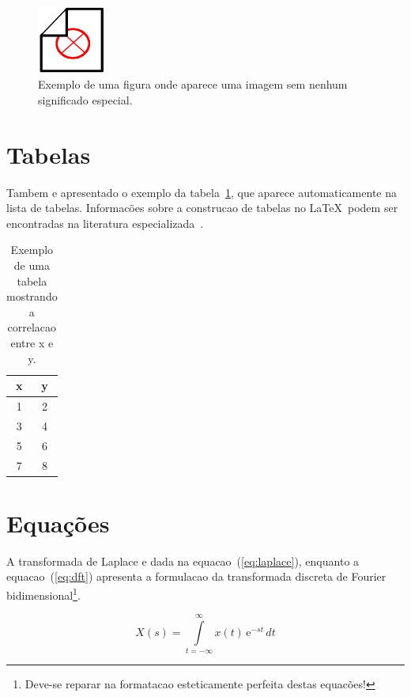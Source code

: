 \documentclass[openright]{normas-utf-tex} %
\begin{document}
\begin{figure}[!htb]
	\centering
	\includegraphics[width=0.2\textwidth]{./dummy.png} %
	\caption[Exemplo de uma figura]{Exemplo de uma figura onde aparece uma imagem sem nenhum significado especial.}
	\label{fig:dummy}
\end{figure}


\section{Tabelas}

Tambem e apresentado o exemplo da tabela~\ref{tab:correlacao}, que aparece automaticamente na lista de tabelas. Informac\~oes sobre a construcao de tabelas no \LaTeX\ podem ser encontradas na literatura especializada~\cite{Lamport1986,Buerger1989,Kopka2003,Mittelbach2004}.

\begin{table}[!htb]
	\centering
	\caption[Exemplo de uma tabela]{Exemplo de uma tabela mostrando a correlacao entre x e y.}
	\label{tab:correlacao}
	\begin{tabular}{cc}
		\hline 
		x & y \\
		\hline
		1 & 2 \\
		3 & 4 \\
		5 & 6 \\
		7 & 8 \\
		\hline 
	\end{tabular}
\end{table}

\section{Equações}

A transformada de Laplace e dada na equacao~(\ref{eq:laplace}), enquanto a equacao~(\ref{eq:dft}) apresenta a formulacao da transformada discreta de Fourier bidimensional\footnote{Deve-se reparar na formatacao esteticamente perfeita destas equac\~oes!}.

\begin{equation}
X(s) = \int\limits_{t = -\infty}^{\infty} x(t) \, \text{e}^{-st} \, dt
\label{eq:laplace}
\end{equation}
\end{document}

